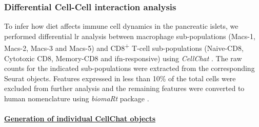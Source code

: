 



\subsubsection{\large Differential Cell-Cell interaction analysis}
\label{subsubsec:met_chp2_cellcell}
To infer how diet affects immune cell dynamics in the pancreatic islets, we performed differential \gls{lr} analysis between macrophage sub-populations (Macs-1, Macs-2, Macs-3 and Macs-5) and CD8\textsuperscript{+} T-cell sub-populations (Naive-CD8, Cytotoxic CD8, Memory-CD8 and \gls{ifn}-responsive) using \textit{CellChat} \textbf{\cite{jin_cellchat_2023}}. The raw counts for the indicated sub-populations were extracted from the corresponding Seurat objects. Features expressed in less than 10\% of the total cells were excluded from further analysis and the remaining features were converted to human nomenclature using \textit{biomaRt} package \textbf{\cite{durinck_biomart_2005,durinck_mapping_2009}}.\\\\

\underline{\normalsize \textbf{Generation of individual CellChat objects}}\\

